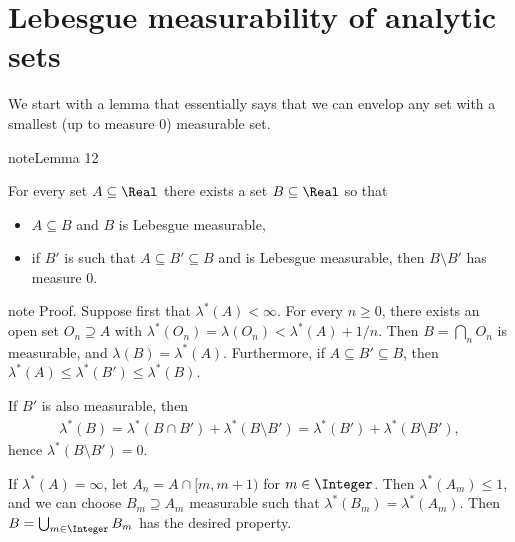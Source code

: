 \documentclass[letterpaper,10pt,english]{jupyterBook}
\begin{document}
\section{Lebesgue measurability of analytic sets}
\label{\detokenize{regularityAnalytic:lebesgue-measurability-of-analytic-sets}}
\sphinxAtStartPar
We start with a lemma that essentially says that we can envelop any
set with a smallest (up to measure \(0\)) measurable set.
\label{regularityAnalytic:lem-approx-measurable}
\begin{sphinxadmonition}{note}{Lemma 12}



\sphinxAtStartPar
For every set \(A \subseteq \Real\) there exists a set \(B \subseteq \Real\) so that
\begin{itemize}
\item {} 
\sphinxAtStartPar
{} \(A \subseteq B\) and \(B\)  is  Lebesgue measurable,

\item {} 
\sphinxAtStartPar
{} if \(B'\) is such that \(A \subseteq B' \subseteq B\)  and is Lebesgue measurable, then \(B\setminus B'\) has measure \(0\).

\end{itemize}
\end{sphinxadmonition}

\begin{sphinxadmonition}{note}
\sphinxAtStartPar
Proof. Suppose first that \(\lambda^*(A) < \infty\). For every \(n \geq 0\), there exists an open set \(O_n \supseteq A\) with \(\lambda^*(O_n) = \lambda(O_n) < \lambda^*(A) + 1/n\). Then \(B = \bigcap_n O_n\) is measurable, and \(\lambda(B) = \lambda^*(A)\). Furthermore, if \(A \subseteq B' \subseteq B \), then \(\lambda^*(A) \leq  \lambda^*(B') \leq \lambda^*(B)\).

\sphinxAtStartPar
If \(B'\) is also measurable, then
\begin{equation*}
\begin{split}
    \lambda^*(B) = \lambda^*(B \cap B') + \lambda^*(B \setminus B') = \lambda^*(B') + \lambda^*(B \setminus B'),  
\end{split}
\end{equation*}
\sphinxAtStartPar
hence \(\lambda^*(B \setminus B') = 0\).

\sphinxAtStartPar
If \(\lambda^*(A) = \infty\), let \(A_n = A \cap [m,m+1)\) for \(m \in \Integer\). Then \(\lambda^*(A_m) \leq 1\), and we can choose \(B_m \supseteq A_m\) measurable such that \(\lambda^*(B_m) = \lambda^*(A_m)\). Then \(B = \bigcup_{m \in \Integer} B_m\) has the desired property.
\end{sphinxadmonition}
\end{document}
